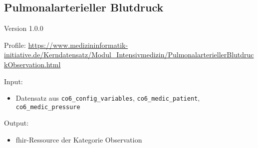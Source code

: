 \subsection{Pulmonalarterieller Blutdruck} 
\noindent Version 1.0.0

\noindent Profile: \url{https://www.medizininformatik-initiative.de/Kerndatensatz/Modul_Intensivmedizin/PulmonalarteriellerBlutdruckObservation.html}

\noindent Input:
\begin{itemize}
	\item Datensatz aus \texttt{co6\_config\_variables}, \texttt{co6\_medic\_patient}, \\ \texttt{co6\_medic\_pressure}
\end{itemize}
Output:
\begin{itemize}
        \item \ac{fhir}-Ressource der Kategorie \glqq Observation\grqq{}
\end{itemize}
